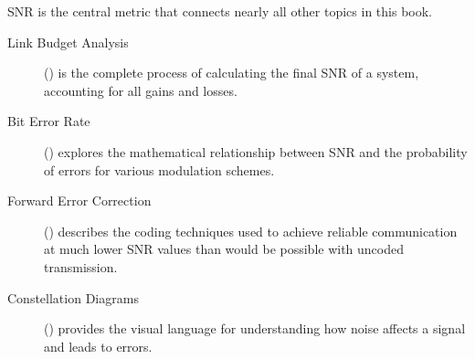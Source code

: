 \begin{importantbox}[title={Further Reading}]
    SNR is the central metric that connects nearly all other topics in this book.
    \begin{description}
        \item[Link Budget Analysis] () is the complete process of calculating the final SNR of a system, accounting for all gains and losses.
        \item[Bit Error Rate] () explores the mathematical relationship between SNR and the probability of errors for various modulation schemes.
        \item[Forward Error Correction] () describes the coding techniques used to achieve reliable communication at much lower SNR values than would be possible with uncoded transmission.
        \item[Constellation Diagrams] () provides the visual language for understanding how noise affects a signal and leads to errors.
    \end{description}
\end{importantbox}
